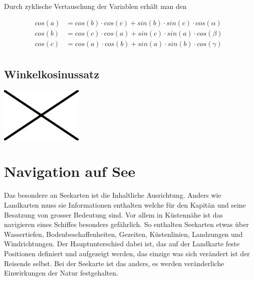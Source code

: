 \begin{refsection}

Durch zyklische Vertauschung der Variablen erhält man den 
\begin{satz}[Seitenkosinussatz]
\label{skript:kugel:satz:seitenkosinussatz}
\end{satz}

\begin{align*}
{cos(a)} &= {cos(b)} \cdot {cos(c)} + {sin(b)} \cdot {sin(c)} \cdot {cos(\alpha)}\\
{cos(b)} &= {cos(c)} \cdot {cos(a)} + {sin (c)} \cdot {sin(a)} \cdot {cos(\beta)}\\
{cos(c)} &= {cos(a)} \cdot {cos(b)} + {sin(a)} \cdot {sin(b)} \cdot {cos(\gamma)}\\
\end{align*}




\subsection{Winkelkosinussatz}

\begin{center}
        \includegraphics[width=0.3\textwidth]{kugel/Beispielbild.jpg}
\end{center}





\section{Navigation auf See}
Das besondere an Seekarten ist die Inhaltliche Ausrichtung. Anders wie Landkarten muss sie Informationen enthalten welche für den Kapitän und seine Besatzung von grosser Bedeutung sind. Vor allem in Küstennähe ist das navigieren eines Schiffes besonders gefährlich. So enthalten Seekarten etwas über Wassertiefen, Bodenbeschaffenheiten, Gezeiten, Küstenlinien, Landzungen und Windrichtungen.
Der Hauptunterschied dabei ist, das auf der Landkarte feste Positionen definiert und aufgezeigt werden, das einzige was sich verändert ist der Reisende selbst. Bei der Seekarte ist das anders, es werden veränderliche Einwirkungen der Natur festgehalten.


\end{refsection}
